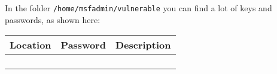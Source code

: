 \begin{enumerate}
    In the folder \texttt{/home/msfadmin/vulnerable} you can find a lot of keys and passwords, as shown here:
    \begin{table}[]
        \centering
        \begin{tabular}{|c|c|c|}
        \hline
        \textbf{Location} & \textbf{Password} & \textbf{Description} \\ \hline
                          &                   &                      \\ \hline
                          &                   &                      \\ \hline
                          &                   &                      \\ \hline
                          &                   &                      \\ \hline
        \end{tabular}
    \end{table}

\end{enumerate}